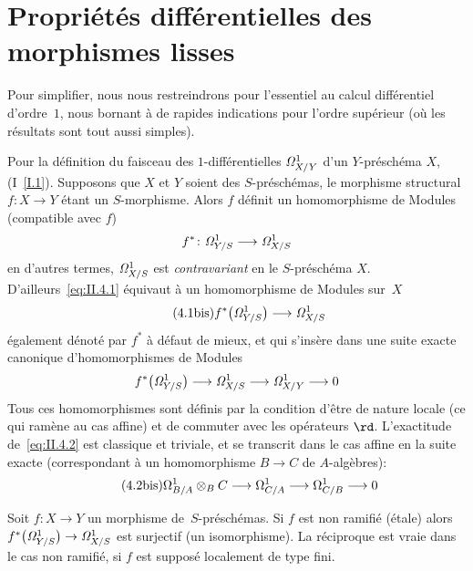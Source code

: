 \section{Propri\'et\'es diff\'erentielles des morphismes lisses}
\label{II.4}
Pour simplifier, nous nous restreindrons pour l'essentiel au calcul
diff\'erentiel d'ordre~$1$, nous bornant \`a de rapides
indications pour l'ordre sup\'erieur (o\`u les r\'esultats sont
tout aussi simples).

Pour la d\'efinition du faisceau des $1$-diff\'erentielles
$\it{\Omega}^1_{X/Y}$ d'un $Y$-pr\'esch\'ema $X$,
\cf (I~\No\ref{I.1}). Supposons que $X$ et $Y$ soient des
$S$-pr\'esch\'emas, le morphisme structural $f\colon X\to Y$
\'etant un $S$-morphisme. Alors $f$ d\'efinit un homomorphisme de
Modules (compatible avec $f$)
\begin{equation}
\label{eq:II.4.1}
{f^*\colon \it{\Omega}^1_{Y/S}\to\it{\Omega}^1_{X/S}}
\end{equation}
en d'autres termes, $\it{\Omega}^1_{X/S}$ est \emph{contravariant} en
le $S$-pr\'esch\'ema $X$. D'ailleurs~\eqref{eq:II.4.1}
\'equivaut \`a un homomorphisme de Modules sur~$X$
\begin{equation*}
\label{eq:II.4.1bis}
\tag{4.1\textrm{bis}}
{f^*\big(\it{\Omega}^1_{Y/S}\big)\to\it{\Omega}^1_{X/S}}
\end{equation*}
\'egalement d\'enot\'e par $f^*$ \`a d\'efaut de mieux, et
qui s'ins\`ere dans une suite exacte canonique d'homomorphismes de
Modules
\begin{equation}
\label{eq:II.4.2}
{f^*\big(\it{\Omega}^1_{Y/S}\big)\to
\it{\Omega}^1_{X/S}\to\it{\Omega}^1_{X/Y}\to 0}
\end{equation}
Tous ces homomorphismes sont d\'efinis par la condition d'\^etre de
nature locale (ce qui ram\`ene au cas affine) et de commuter avec
les op\'erateurs $\rd$. L'exactitude de~\eqref{eq:II.4.2} est
classique et triviale, et se transcrit dans le cas affine en la suite
exacte (correspondant \`a un homomorphisme $B\to C$ de
$A$-alg\`ebres):
\begin{equation*}
\label{eq:II.4.2bis}
\tag{4.2\textrm{bis}}
{\Omega^1_{B/A}\otimes_{B}C\to\Omega^1_{C/A}\to\Omega^1_{C/B}\to 0}
\end{equation*}

\begin{lemme}
\label{II.4.1}
Soit
$f\colon X\to Y$ un morphisme de~$S$-pr\'esch\'emas. Si $f$
est non ramifi\'e (\resp \'etale) alors
$f^*\big(\it{\Omega}^1_{Y/S}\big)\to\it{\Omega}^1_{X/S}$
est surjectif (\resp un isomorphisme). La r\'eciproque est vraie
dans le cas \og non ramifi\'e\fg, si $f$ est suppos\'e localement de
type fini.
\end{lemme}

